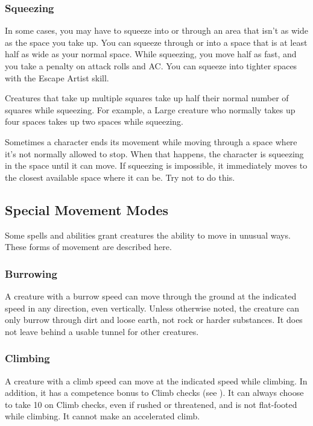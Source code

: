 \subsubsection{Squeezing}

In some cases, you may have to squeeze into or through an area that isn't as wide as the space you take up. You can squeeze through or into a space that is at least half as wide as your normal space. While squeezing, you move half as fast, and you take a  penalty on attack rolls and AC. You can squeeze into tighter spaces with the Escape Artist skill.

Creatures that take up multiple squares take up half their normal number of squares while squeezing. For example, a Large creature who normally takes up four spaces takes up two spaces while squeezing.

 Sometimes a character ends its movement while moving through a space where it's not normally allowed to stop. When that happens, the character is squeezing in the space until it can move. If squeezing is impossible, it immediately moves to the closest available space where it can be. Try not to do this.

\subsection{Special Movement Modes}\label{Special Movement Modes}
Some spells and abilities grant creatures the ability to move in unusual ways. These forms of movement are described here.

\subsubsection{Burrowing}\label{Burrowing}
A creature with a burrow speed can move through the ground at the indicated speed in any direction, even vertically. Unless otherwise noted, the creature can only burrow through dirt and loose earth, not rock or harder substances. It does not leave behind a usable tunnel for other creatures. 

\subsubsection{Climbing}\label{Climbing}
A creature with a climb speed can move at the indicated speed while climbing. In addition, it has a  competence bonus to Climb checks (see ). It can always choose to take 10 on Climb checks, even if rushed or threatened, and is not flat-footed while climbing. It cannot make an accelerated climb. 

